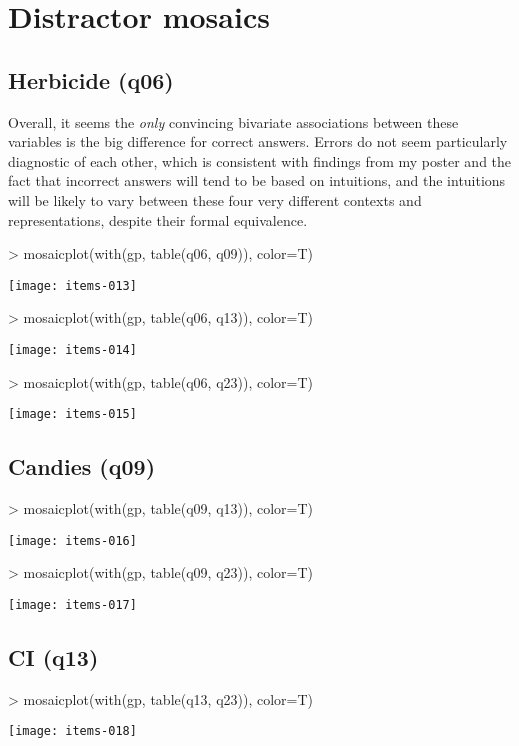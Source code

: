 \documentclass[11pt]{article}
\begin{document}
\section{Distractor mosaics}
\label{sec-3}

\subsection{Herbicide (q06)}
\label{sec-3-1}
Overall, it seems the \emph{only} convincing bivariate associations between these variables is the big difference for correct answers.  Errors do not seem particularly diagnostic of each other, which is consistent with findings from my poster and the fact that incorrect answers will tend to be based on intuitions, and the intuitions will be likely to vary between these four very different contexts and representations, despite their formal equivalence.


\begin{Schunk}
\begin{Sinput}
> mosaicplot(with(gp, table(q06, q09)), color=T)
\end{Sinput}
\end{Schunk}
\texttt{[image: items-013]}

\begin{Schunk}
\begin{Sinput}
> mosaicplot(with(gp, table(q06, q13)), color=T)
\end{Sinput}
\end{Schunk}
\texttt{[image: items-014]}

\begin{Schunk}
\begin{Sinput}
> mosaicplot(with(gp, table(q06, q23)), color=T)
\end{Sinput}
\end{Schunk}
\texttt{[image: items-015]}
\subsection{Candies (q09)}
\label{sec-3-2}

\begin{Schunk}
\begin{Sinput}
> mosaicplot(with(gp, table(q09, q13)), color=T)
\end{Sinput}
\end{Schunk}
\texttt{[image: items-016]}

\begin{Schunk}
\begin{Sinput}
> mosaicplot(with(gp, table(q09, q23)), color=T)
\end{Sinput}
\end{Schunk}
\texttt{[image: items-017]}
\subsection{CI (q13)}
\label{sec-3-3}
\begin{Schunk}
\begin{Sinput}
> mosaicplot(with(gp, table(q13, q23)), color=T)
\end{Sinput}
\end{Schunk}
\texttt{[image: items-018]}
\end{document}
